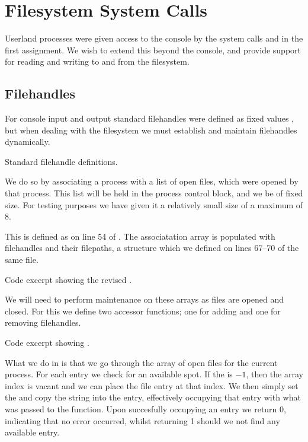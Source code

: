 %
%
%

\section{Filesystem System Calls}
Userland processes were given access to the console by the system calls
 and  in the first assignment. We
wish to extend this beyond the console, and provide support for reading and
writing to and from the filesystem.

\subsection{Filehandles}
For console input and output standard filehandles were defined as fixed values
, but when dealing with the filesystem we must
establish and maintain filehandles dynamically.

\begin{multicols}{2}

    {Standard filehandle definitions.}
    
    \columnbreak
    
    We do so by associating a process with a list of open files, which were
    opened by that process. This list will be held in the process control
    block, and we be of fixed size. For testing purposes we have given it a
    relatively small size of a maximum of 8.
    
\end{multicols}

This is defined as  on line 54 of
. The associatation array is populated with filehandles
and their filepaths, a structure which we defined on lines 67--70 of the same
file.

{Code excerpt showing the revised .}

We will need to perform maintenance on these arrays as files are opened and
closed. For this we define two accessor functions; one for adding and one for
removing filehandles.

{Code excerpt showing .}

What we do in  is that we go through the array
of open files for the current process. For each entry we check for an
available spot. If the  is $-1$, then the array index is
vacant and we can place the file entry at that index. We then simply set the
 and copy the  string into the entry,
effectively occupying that entry with what was passed to the function. Upon
succesfully occupying an entry we return 0, indicating that no error occurred,
whilst returning 1 should we not find any available entry.

